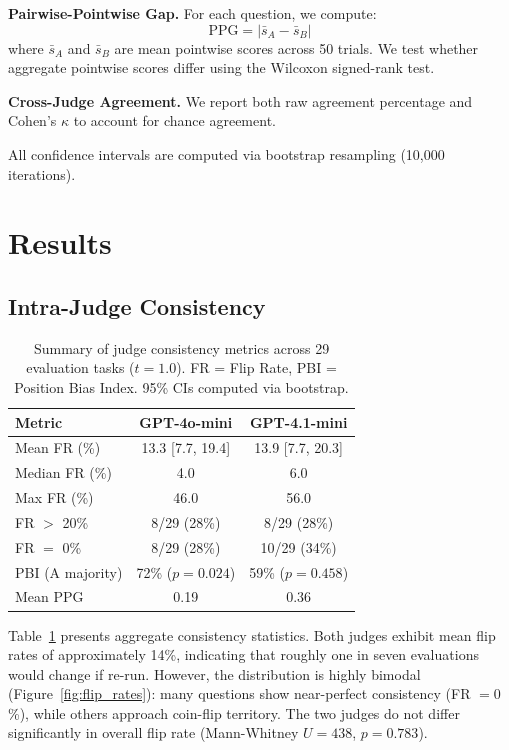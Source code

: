 \documentclass{ijclclp}
\begin{document}
\textbf{Pairwise-Pointwise Gap.} For each question, we compute:
\begin{equation}
    \text{PPG} = |\bar{s}_A - \bar{s}_B|
\end{equation}
where $\bar{s}_A$ and $\bar{s}_B$ are mean pointwise scores across 50 trials. We test whether aggregate pointwise scores differ using the Wilcoxon signed-rank test.

\textbf{Cross-Judge Agreement.} We report both raw agreement percentage and Cohen's $\kappa$ to account for chance agreement.

All confidence intervals are computed via bootstrap resampling (10,000 iterations).

\section{Results}

\subsection{Intra-Judge Consistency}

\begin{table}[h]
\centering
\caption{Summary of judge consistency metrics across 29 evaluation tasks ($t=1.0$). FR = Flip Rate, PBI = Position Bias Index. 95\% CIs computed via bootstrap.}
\label{tab:summary}
\begin{tabular}{lcc}
\toprule
\textbf{Metric} & \textbf{GPT-4o-mini} & \textbf{GPT-4.1-mini} \\
\midrule
Mean FR (\%) & 13.3 [7.7, 19.4] & 13.9 [7.7, 20.3] \\
Median FR (\%) & 4.0 & 6.0 \\
Max FR (\%) & 46.0 & 56.0 \\
FR $>$ 20\% & 8/29 (28\%) & 8/29 (28\%) \\
FR $=$ 0\% & 8/29 (28\%) & 10/29 (34\%) \\
PBI (A majority) & 72\% ($p=0.024$) & 59\% ($p=0.458$) \\
Mean PPG & 0.19 & 0.36 \\
\bottomrule
\end{tabular}
\end{table}

Table~\ref{tab:summary} presents aggregate consistency statistics. Both judges exhibit mean flip rates of approximately 14\%, indicating that roughly one in seven evaluations would change if re-run. However, the distribution is highly bimodal (Figure~\ref{fig:flip_rates}): many questions show near-perfect consistency (FR $= 0$\%), while others approach coin-flip territory. The two judges do not differ significantly in overall flip rate (Mann-Whitney $U = 438$, $p = 0.783$).
\end{document}
